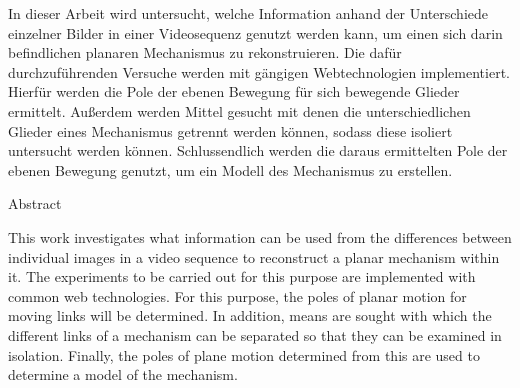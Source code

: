 %
\label{sec:abstract}

In dieser Arbeit wird untersucht, welche Information anhand der Unterschiede einzelner Bilder in einer Videosequenz genutzt werden kann, um einen sich darin befindlichen planaren Mechanismus zu rekonstruieren.
Die dafür durchzuführenden Versuche werden mit gängigen Webtechnologien implementiert.
Hierfür werden die Pole der ebenen Bewegung für sich bewegende Glieder ermittelt.
Au{\ss}erdem werden Mittel gesucht mit denen die unterschiedlichen Glieder eines Mechanismus getrennt werden können, sodass diese isoliert untersucht werden können.
Schlussendlich werden die daraus ermittelten Pole der ebenen Bewegung genutzt, um ein Modell des Mechanismus zu erstellen.

\vspace*{20mm}

{Abstract}
\label{sec:abstract-diff}

This work investigates what information can be used from the differences between individual images in a video sequence to reconstruct a planar mechanism within it.
The experiments to be carried out for this purpose are implemented with common web technologies.
For this purpose, the poles of planar motion for moving links will be determined.
In addition, means are sought with which the different links of a mechanism can be separated so that they can be examined in isolation.
Finally, the poles of plane motion determined from this are used to determine a model of the mechanism.
